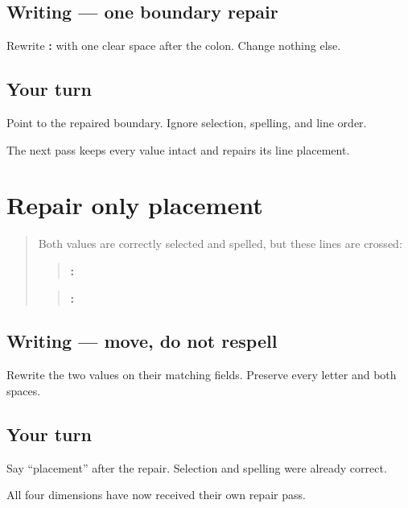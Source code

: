 \subsection*{Writing — one boundary repair}
Rewrite \textbf{:} with one clear space after the colon. Change nothing else.

\subsection*{Your turn}
Point to the repaired boundary. Ignore selection, spelling, and line order.

\begin{tcolorbox}[breakable,colback=teal!4,colframe=teal!35!black,title={Before you move on}]
The next pass keeps every value intact and repairs its line placement.
\end{tcolorbox}
\section[\texorpdfstring{\pa{ਭਾਸ਼ਾ}: \pa{ਪੰਜਾਬੀ} … (three-field …)}{ਭਾਸ਼ਾ: ਪੰਜਾਬੀ … (three-field …)}]{Repair only placement}

\label{lesson:PA-W06-placement-repair}



\begin{quote}
Both values are correctly selected and spelled, but these lines are crossed:

\begin{quote}
\textbf{: }
\end{quote}

\begin{quote}
\textbf{: }
\end{quote}
\end{quote}

\subsection*{Writing — move, do not respell}
Rewrite the two values on their matching fields. Preserve every letter and both spaces.

\subsection*{Your turn}
Say “placement” after the repair. Selection and spelling were already correct.

\begin{tcolorbox}[breakable,colback=teal!4,colframe=teal!35!black,title={Before you move on}]
All four dimensions have now received their own repair pass.
\end{tcolorbox}
